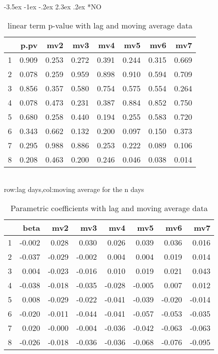 \documentclass[a4paper, 12pt]{article}
\makeatletter
\def\large{\fontsize{14}{20}\selectfont}
\renewcommand\subsection{\@startsection {subsection}{1}{\z@}%
                                   {-3.5ex \@plus -1ex \@minus -.2ex}%
                                   {2.3ex \@plus.2ex}%
                                   {\centering\normalfont\large\bfseries}}
\makeatother
\begin{document}
\subsection*{NO}
\begin{table}[h]
\centering
\caption{linear term p-value with lag and moving average data}
\begin{tabular}{rrrrrrrr}
  \hline
 & p.pv & mv2 & mv3 & mv4 & mv5 & mv6 & mv7 \\
  \hline
1 & 0.909 & 0.253 & 0.272 & 0.391 & 0.244 & 0.315 & 0.669 \\
  2 & 0.078 & 0.259 & 0.959 & 0.898 & 0.910 & 0.594 & 0.709 \\
  3 & 0.856 & 0.357 & 0.580 & 0.754 & 0.575 & 0.554 & 0.264 \\
  4 & 0.078 & 0.473 & 0.231 & 0.387 & 0.884 & 0.852 & 0.750 \\
  5 & 0.680 & 0.258 & 0.440 & 0.194 & 0.255 & 0.583 & 0.720 \\
  6 & 0.343 & 0.662 & 0.132 & 0.200 & 0.097 & 0.150 & 0.373 \\
  7 & 0.295 & 0.988 & 0.886 & 0.253 & 0.222 & 0.089 & 0.106 \\
  8 & 0.208 & 0.463 & 0.200 & 0.246 & 0.046 & 0.038 & 0.014 \\
   \hline
\end{tabular}
\\row:lag days,col:moving average for the n days
\end{table}

\begin{table}[h]
\centering
\caption{Parametric coefficients with lag and moving average data}
\begin{tabular}{rrrrrrrr}
  \hline
 & beta & mv2 & mv3 & mv4 & mv5 & mv6 & mv7 \\
  \hline
1 & -0.002 & 0.028 & 0.030 & 0.026 & 0.039 & 0.036 & 0.016 \\
  2 & -0.037 & -0.029 & -0.002 & 0.004 & 0.004 & 0.019 & 0.014 \\
  3 & 0.004 & -0.023 & -0.016 & 0.010 & 0.019 & 0.021 & 0.043 \\
  4 & -0.038 & -0.018 & -0.035 & -0.028 & -0.005 & 0.007 & 0.012 \\
  5 & 0.008 & -0.029 & -0.022 & -0.041 & -0.039 & -0.020 & -0.014 \\
  6 & -0.020 & -0.011 & -0.044 & -0.041 & -0.057 & -0.053 & -0.035 \\
  7 & 0.020 & -0.000 & -0.004 & -0.036 & -0.042 & -0.063 & -0.063 \\
  8 & -0.026 & -0.018 & -0.036 & -0.036 & -0.068 & -0.076 & -0.095 \\
   \hline
\end{tabular}
\end{table}
\clearpage
\end{document}
